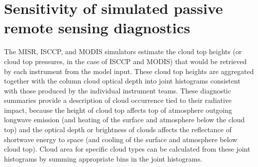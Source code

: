 
\section{Sensitivity of simulated passive remote sensing diagnostics} 
The MISR, ISCCP, and MODIS simulators estimate the cloud top heights (or cloud top pressures, in the case of ISCCP and MODIS) that would be retrieved by each instrument from the model input. These cloud top heights are aggregated together with the column cloud optical depth into joint histograms consistent with those produced by the individual instrument teams. These diagnostic summaries provide a description of cloud occurrence tied to their radiative impact, because the height of cloud top affects top of atmosphere outgoing longwave emission (and heating of the surface and atmosphere below the cloud top) and the optical depth or brightness of clouds affects the reflectance of shortwave energy to space (and cooling of the surface and atmosphere below cloud top). Cloud area for specific cloud types can be calculated from these joint histograms by summing appropriate bins in the joint histograms. 

